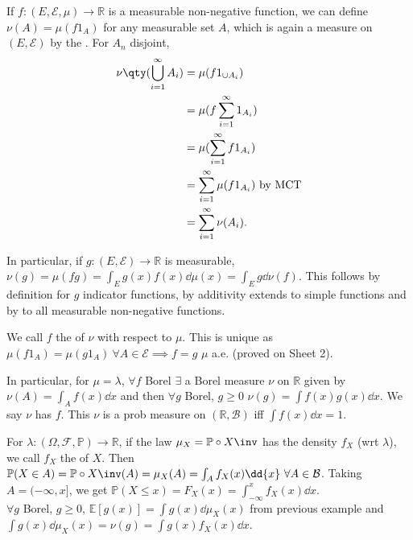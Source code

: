\begin{example}
	If $f \colon (E, \mathcal E, \mu) \to \mathbb R$ is a measurable non-negative function, we can define $\nu(A) = \mu(f 1_A)$ for any measurable set $A$, which is again a measure on $(E, \mathcal E)$ by the .
	For $A_n$ disjoint,
	\begin{align*}
		\nu\qty(\bigcup_{i=1}^\infty A_i) &= \mu(f 1_{\cup A_i}) \\
		&= \mu(f \sum_{i=1}^{\infty} 1_{A_i}) \\
		&= \mu(\sum_{i=1}^{\infty} f 1_{A_i}) \\
		&= \sum_{i=1}^{\infty} \mu(f 1_{A_i}) \text{ by MCT} \\
		&= \sum_{i=1}^{\infty} \nu(A_i).
	\end{align*}

	In particular, if $g \colon (E, \mathcal E) \to \mathbb R$ is measurable, $\nu(g) = \mu(fg) = \int_E g(x) f(x) \dd{\mu(x)} = \int_E g \dd{\nu(f)}$.
	This follows by definition for $g$ indicator functions, by additivity extends to simple functions and by  to all measurable non-negative functions.

	We call $f$ the  of $\nu$ with respect to $\mu$.
	This is unique as $\mu(f 1_A) = \mu(g 1_A) \ \forall A \in \mathcal{E} \implies f = g$ $\mu$ a.e. (proved on Sheet 2).

	In particular, for $\mu = \lambda$, $\forall f$ Borel $\exists$ a Borel measure $\nu$ on $\mathbb{R}$ given by $\nu(A) = \int_A f(x) \dd{x}$ and then $\forall g$ Borel, $g \geq 0$ $\nu(g) = \int f(x) g(x) \dd{x}$.
	We say $\nu$ has  $f$.
	This $\nu$ is a prob measure on $(\mathbb{R}, \mathcal{B})$ iff $\int f(x) \dd{x} = 1$.

	For $\lambda : (\Omega, \mathcal{F}, \mathbb{P}) \to \mathbb{R}$, if the law $\mu_X = \mathbb{P} \circ X\inv$ has the density $f_X$ (wrt $\lambda$), we call $f_X$ the  of $X$.
	Then $\mathbb{P}(X \in A) = \mathbb{P} \circ X\inv (A) = \mu_X(A) = \int_A f_X(x) \dd{x} \ \forall A \in \mathcal{B}$.
	Taking $A = (-\infty, x]$, we get $\mathbb{P}(X \leq x) = F_X(x) = \int_{-\infty}^{x} f_X(x) \dd{x}$. \\
	$\forall g$ Borel, $g \geq 0$, $\mathbb{E}[g(x)] = \int g(x) \dd{\mu_X(x)}$ from previous example and $\int g(x) \dd{\mu_X(x)} = \nu(g) = \int g(x) f_X(x) \dd{x}$.
\end{example}
